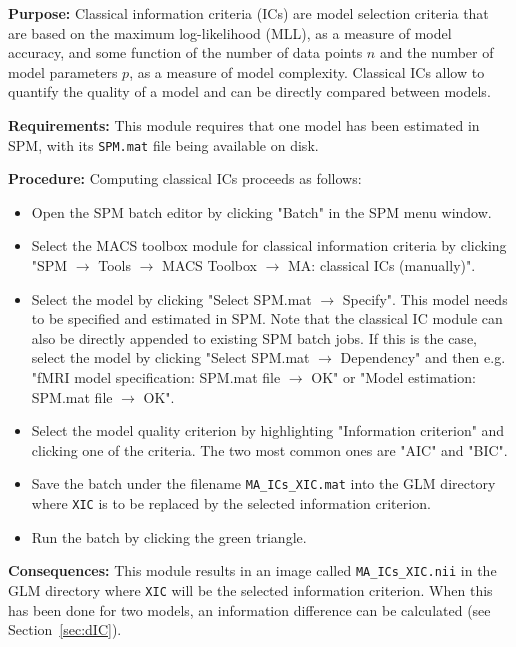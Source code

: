 \documentclass[a4paper,12pt]{article}
\newcommand{\ra}{$\rightarrow$ }
\begin{document}
\textbf{Purpose:} Classical information criteria (ICs) are model selection criteria that are based on the maximum log-likelihood (MLL), as a measure of model accuracy, and some function of the number of data points $n$ and the number of model parameters $p$, as a measure of model complexity. Classical ICs allow to quantify the quality of a model and can be directly compared between models.

\textbf{Requirements:} This module requires that one model has been estimated in SPM, with its \texttt{SPM.mat} file being available on disk.

\textbf{Procedure:} Computing classical ICs proceeds as follows:
\begin{itemize}

\item
Open the SPM batch editor by clicking "Batch" in the SPM menu window.

\item
Select the MACS toolbox module for classical information criteria by clicking "SPM \ra Tools \ra MACS Toolbox \ra MA: classical ICs (manually)".

\item
Select the model by clicking "Select SPM.mat \ra Specify". This model needs to be specified and estimated in SPM. Note that the classical IC module can also be directly appended to existing SPM batch jobs. If this is the case, select the model by clicking "Select SPM.mat \ra Dependency" and then e.g. "fMRI model specification: SPM.mat file \ra OK" or "Model estimation: SPM.mat file \ra OK".

\item
Select the model quality criterion by highlighting "Information criterion" and clicking one of the criteria. The two most common ones are "AIC" and "BIC".

\item
Save the batch under the filename \texttt{MA\_ICs\_XIC.mat} into the GLM directory where \texttt{XIC} is to be replaced by the selected information criterion.

\item
Run the batch by clicking the green triangle.

\end{itemize}

\textbf{Consequences:} This module results in an image called \texttt{MA\_ICs\_XIC.nii} in the GLM directory where \texttt{XIC} will be the selected information criterion. When this has been done for two models, an information difference can be calculated (see Section~\ref{sec:dIC}).
\end{document}
